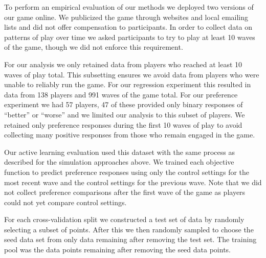 \documentclass{sig-alternate}
\begin{document}
To perform an empirical evaluation of our methods we deployed two versions of our game online.
We publicized the game through websites and local emailing lists and did not offer compensation to participants.
In order to collect data on patterns of play over time we asked participants to try to play at least 10 waves of the game, though we did not enforce this requirement.

For our analysis we only retained data from players who reached at least 10 waves of play total. %
This subsetting ensures we avoid data from players who were unable to reliably run the game.
For our regression experiment this resulted in data from 138 players and 991 waves of the game total.
For our preference experiment we had 57 players, 47 of these provided only binary responses of ``better'' or ``worse'' and we limited our analysis to this subset of players.
We retained only preference responses during the first 10 waves of play to avoid collecting many positive responses from those who remain engaged in the game.



Our active learning evaluation used this dataset with the same process as described for the simulation approaches above.
We trained each objective function to predict preference responses using only the control settings for the most recent wave and the control settings for the previous wave.
Note that we did not collect preference comparisons after the first wave of the game as players could not yet compare control settings.

For each cross-validation split we constructed a test set of data by randomly selecting a subset of points.
After this we then randomly sampled to choose the seed data set from only data remaining after removing the test set.
The training pool was the data points remaining after removing the seed data points.
\end{document}
